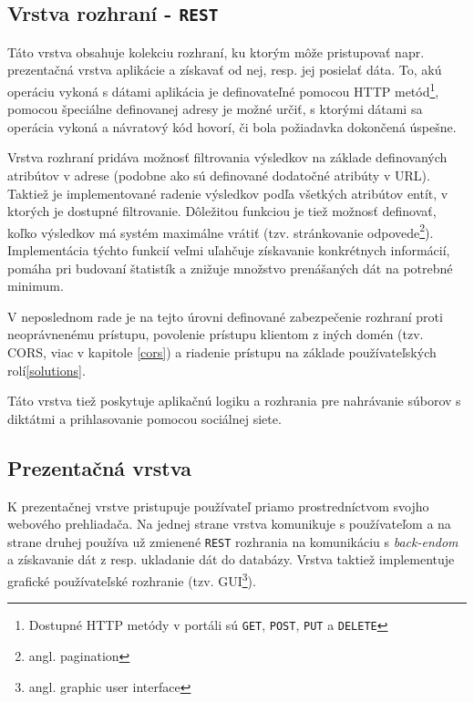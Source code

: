 \documentclass[12pt,oneside]{fithesis2}
\begin{document}
      	\subsection{Vrstva rozhraní - \texttt{REST}}
      \par Táto vrstva obsahuje kolekciu rozhraní, ku ktorým môže pristupovať napr. prezentačná vrstva aplikácie a získavať od nej, resp. jej posielať dáta. To, akú operáciu vykoná s dátami aplikácia je definovateľné pomocou HTTP metód\footnote{Dostupné HTTP metódy v portáli sú \texttt{GET}, \texttt{POST}, \texttt{PUT} a \texttt{DELETE}}, pomocou špeciálne definovanej adresy je možné určiť, s ktorými dátami sa operácia vykoná a návratový kód hovorí, či bola požiadavka dokončená úspešne.
      \par Vrstva rozhraní pridáva možnosť filtrovania výsledkov na základe definovaných atribútov v adrese (podobne ako sú definované dodatočné atribúty v URL). Taktiež je implementované radenie výsledkov podľa všetkých atribútov entít, v ktorých je dostupné filtrovanie. Dôležitou funkciou je tiež možnosť definovať, koľko výsledkov má systém maximálne vrátiť (tzv. stránkovanie odpovede\footnote{angl. pagination}). Implementácia týchto funkcií veľmi uľahčuje získavanie konkrétnych informácií, pomáha pri budovaní štatistík a znižuje množstvo prenášaných dát na potrebné minimum. 
      \par V neposlednom rade je na tejto úrovni definované zabezpečenie rozhraní proti neoprávnenému prístupu, povolenie prístupu klientom z iných domén (tzv. CORS, viac v kapitole \ref{cors}) a riadenie prístupu na základe používateľských rolí\ref{solutions}.
      \par Táto vrstva tiež poskytuje aplikačnú logiku a rozhrania pre nahrávanie súborov s diktátmi a prihlasovanie pomocou sociálnej siete.
      

      	\subsection{Prezentačná vrstva} \label{pres-layer}
      \par K prezentačnej vrstve pristupuje používateľ priamo prostredníctvom svojho webového prehliadača. Na jednej strane vrstva komunikuje s používateľom a na strane druhej používa už zmienené \texttt{REST} rozhrania na komunikáciu s \textit{back-endom} a získavanie dát z resp. ukladanie dát do databázy. Vrstva taktiež implementuje grafické používateľské rozhranie (tzv. GUI\footnote{angl. graphic user interface}). 
      
\end{document}
